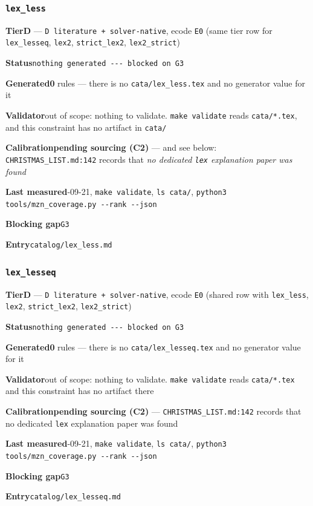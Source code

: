 \documentclass[10pt,a4paper]{article}
\newcommand{\entryfield}[2]{{\raggedright\textbf{#1}\quad #2\par}}
\begin{document}
\subsubsection*{\texttt{lex\_\allowbreak{}less}}
\label{entry:lex-less}
\entryfield{Tier}{\textbf{D} --- \texttt{D literature + solver-\allowbreak{}native}, ecode \texttt{E0} (same tier row for \texttt{lex\_lesseq}, \texttt{lex2}, \texttt{strict\_lex2}, \texttt{lex2\_strict})}
\entryfield{Status}{\texttt{nothing generated -\allowbreak{}-\allowbreak{}-\allowbreak{} blocked on G3}}
\entryfield{Generated}{\textbf{0} rules --- there is no \texttt{cata/lex\_less.tex} and no generator value for it}
\entryfield{Validator}{out of scope: nothing to validate. \texttt{make validate} reads \texttt{cata/*.tex}, and this constraint has no artifact in \texttt{cata/}}
\entryfield{Calibration}{\textbf{pending sourcing (C2)} --- and see below: \texttt{CHRISTMAS\_LIST.md:142} records that \emph{no dedicated \texttt{lex} explanation paper was found}}
\entryfield{Last measured}{2026-09-21, \texttt{make validate}, \texttt{ls cata/}, \texttt{python3 tools/\allowbreak{}mzn\_\allowbreak{}coverage.\allowbreak{}py -\allowbreak{}-\allowbreak{}rank -\allowbreak{}-\allowbreak{}json}}
\entryfield{Blocking gap}{\texttt{G3}}
\entryfield{Entry}{\texttt{catalog/lex\_less.md}}
\subsubsection*{\texttt{lex\_\allowbreak{}lesseq}}
\label{entry:lex-lesseq}
\entryfield{Tier}{\textbf{D} --- \texttt{D literature + solver-\allowbreak{}native}, ecode \texttt{E0} (shared row with \texttt{lex\_less}, \texttt{lex2}, \texttt{strict\_lex2}, \texttt{lex2\_strict})}
\entryfield{Status}{\texttt{nothing generated -\allowbreak{}-\allowbreak{}-\allowbreak{} blocked on G3}}
\entryfield{Generated}{\textbf{0} rules --- there is no \texttt{cata/lex\_lesseq.tex} and no generator value for it}
\entryfield{Validator}{out of scope: nothing to validate. \texttt{make validate} reads \texttt{cata/*.tex} and this constraint has no artifact there}
\entryfield{Calibration}{\textbf{pending sourcing (C2)} --- \texttt{CHRISTMAS\_LIST.md:142} records that no dedicated \texttt{lex} explanation paper was found}
\entryfield{Last measured}{2026-09-21, \texttt{make validate}, \texttt{ls cata/}, \texttt{python3 tools/\allowbreak{}mzn\_\allowbreak{}coverage.\allowbreak{}py -\allowbreak{}-\allowbreak{}rank -\allowbreak{}-\allowbreak{}json}}
\entryfield{Blocking gap}{\texttt{G3}}
\entryfield{Entry}{\texttt{catalog/lex\_lesseq.md}}
\end{document}
